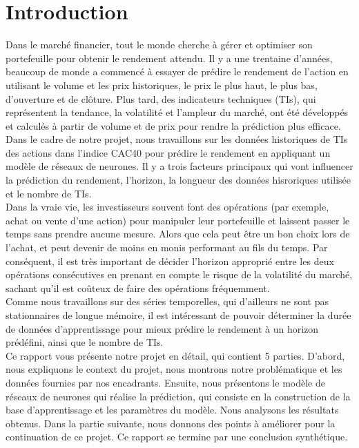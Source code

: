 
\section{Introduction}

Dans le marché financier, tout le monde cherche à gérer et optimiser son portefeuille pour obtenir le rendement attendu. Il y a une trentaine d'années, beaucoup de monde a commencé à essayer de prédire le rendement de l'action en utilisant le volume et les prix historiques, le prix le plus haut, le plus bas, d'ouverture et de clôture. Plus tard, des indicateurs techniques (TIs), qui représentent la tendance, la volatilité et l'ampleur du marché, ont été développés et calculés à partir de volume et de prix pour rendre la prédiction plus efficace.\\

Dans le cadre de notre projet, nous travaillons sur les données historiques de TIs des actions dans l'indice CAC40 pour prédire le rendement en appliquant un modèle de réseaux de neurones. Il y a trois facteurs principaux qui vont influencer la prédiction du rendement, l'horizon, la longueur des données hisroriques utilisée et le nombre de TIs.\\

Dans la vraie vie, les investisseurs souvent font des opérations (par exemple, achat ou vente d'une action) pour manipuler leur portefeuille et laissent passer le temps sans prendre aucune mesure. Alors que cela peut être un bon choix lors de l'achat, et peut devenir de moins en monis performant au fils du temps. Par conséquent, il est très important de décider l'horizon approprié entre les deux opérations consécutives en prenant en compte le risque de la volatilité du marché, sachant qu'il est coûteux de faire des opérations fréquemment.\\

Comme nous travaillons sur des séries temporelles, qui d'ailleurs ne sont pas stationnaires de longue mémoire, il est intéressant de pouvoir déterminer la durée de données d'apprentissage pour mieux prédire le rendement à un horizon prédéfini, ainsi que le nombre de TIs.\\

Ce rapport vous présente notre projet en détail, qui contient 5 parties. D’abord, nous expliquons le context du projet, nous montrons notre problématique et les données fournies par nos encadrants. Ensuite, nous présentons le modèle de réseaux de neurones qui réalise la prédiction, qui consiste en la construction de la base d’apprentissage et les paramètres du modèle. Nous analysons les résultats obtenus. Dans la partie suivante, nous donnons des points à améliorer pour la continuation de ce projet. Ce rapport se termine par une conclusion synthétique. 


